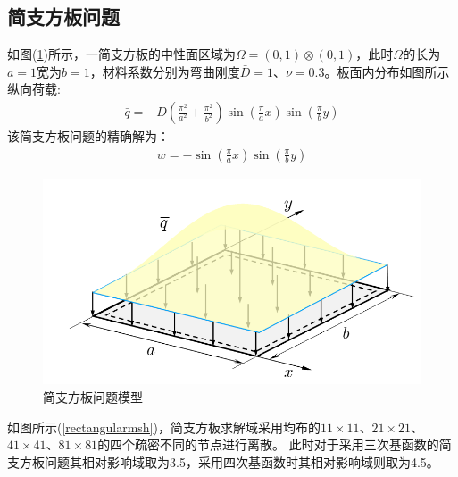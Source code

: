 \subsection{简支方板问题}
如图(\ref{rectangular})所示，一简支方板的中性面区域为$\Omega=(0,1)\otimes(0,1)$，此时$\Omega$的长为$a=1$宽为$b=1$，材料系数分别为弯曲刚度$\bar{D}=1$、$\nu=0.3$。板面内分布如图所示纵向荷载:
\begin{equation}
\begin{split}
    \bar q=-\bar D(\frac{\pi^2}{a^2}+\frac{\pi^2}{b^2})\sin(\frac{\pi}{a}x)\sin(\frac{\pi}{b}y)
\end{split}
\end{equation}
该简支方板问题的精确解为：
\begin{equation}
\begin{split}
    w=-\sin(\frac{\pi}{a}x)\sin(\frac{\pi}{b}y)
\end{split}
\end{equation}
\newpage
\begin{figure}[H]
\centering
    \includegraphics[scale=0.8]{figure/PHR/R/rectangular.png}
    \caption{简支方板问题模型}\label{rectangular}
\end{figure}
如图所示(\ref{rectangularmsh})，简支方板求解域采用均布的$11\times 11$、$21\times 21$、$41\times 41$、$81\times 81$的四个疏密不同的节点进行离散。
此时对于采用三次基函数的简支方板问题其相对影响域取为3.5，采用四次基函数时其相对影响域则取为4.5。\par
